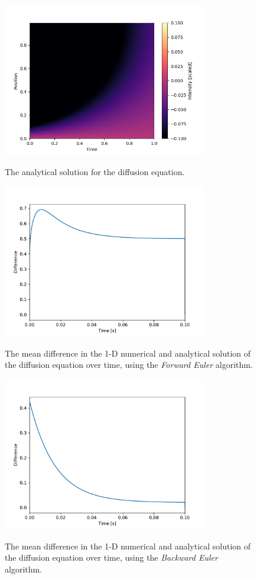 \documentclass[a4paper,10pt,english]{article}
\begin{document}
\begin{figure}[H]
\centering
{\includegraphics[width=0.8\textwidth]{analytical_solution.png}}
\caption{The analytical solution for the diffusion equation.\label{fig_0}}
\end{figure}

\begin{figure}[H]
 \centering
  {\includegraphics[width=0.8\textwidth]{fig1_fwd.pdf}}
  \caption{The mean difference in the 1-D numerical and analytical solution of the diffusion equation over time, using the \textit{Forward Euler} algorithm.\label{fig_5}}
\end{figure}

\begin{figure}[H]
 \centering
  {\includegraphics[width=0.8\textwidth]{fig1_bwd.pdf}}
  \caption{The mean difference in the 1-D numerical and analytical solution of the diffusion equation over time, using the \textit{Backward Euler} algorithm.\label{fig_6}}
\end{figure}
\end{document}
